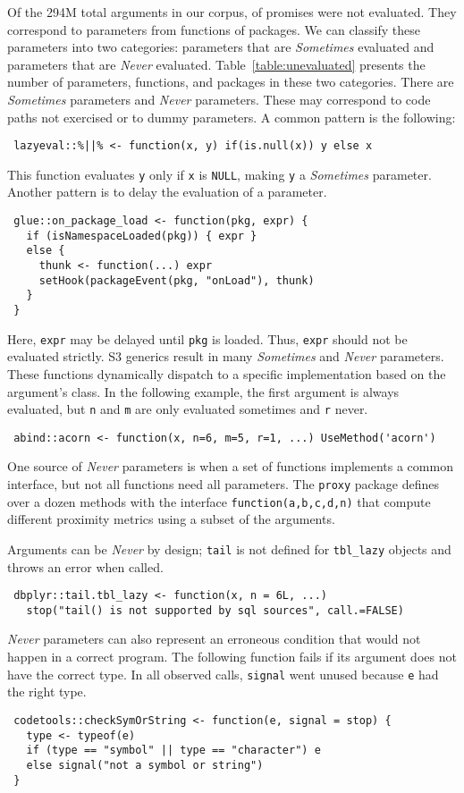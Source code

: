 \documentclass[review,creen,acmsmall]{acmart}
\newcommand{\sometimes}{\emph{Sometimes}\xspace}
\newcommand{\never}{\emph{Never}\xspace}
\newcommand{\code}[1]{\lstinline |#1|\xspace}
\begin{document}
Of the 294M total arguments in our corpus, \UnevaluatedTotalCountArguments of
promises were not evaluated. They correspond to \UnevaluatedTotalCountParameters
parameters from \UnevaluatedTotalCountFunctions functions of
\UnevaluatedTotalCountPackages packages. We can classify these parameters into
two categories: parameters that are \sometimes evaluated and parameters that are
\never evaluated. Table~\ref{table:unevaluated} presents the number of
parameters, functions, and packages in these two categories. There are
\UnevaluatedSometimesCountParameters \sometimes parameters and
\UnevaluatedNeverCountParameters \never parameters. These may correspond to code
paths not exercised or to dummy parameters.
%
A common pattern is the following:
%
\begin{lstlisting}
 lazyeval::%||% <- function(x, y) if(is.null(x)) y else x
\end{lstlisting}
%
This function evaluates \code{y} only if \code{x} is \code{NULL}, making
\code{y} a \sometimes parameter.
\noindent
Another pattern is to delay the evaluation of a parameter.

\begin{lstlisting}
 glue::on_package_load <- function(pkg, expr) {
   if (isNamespaceLoaded(pkg)) { expr }
   else {
     thunk <- function(...) expr
     setHook(packageEvent(pkg, "onLoad"), thunk)
   }
 }
\end{lstlisting}
%
Here, \code{expr} may be delayed until \code{pkg} is loaded. Thus, \code{expr}
should not be evaluated strictly.
%
S3 generics result in many \sometimes and \never parameters. These functions
dynamically dispatch to a specific implementation based on the argument's class.
In the following example, the first argument is always evaluated, but \code{n}
and \code{m} are only evaluated sometimes and \code{r} never.
%
\begin{lstlisting}
 abind::acorn <- function(x, n=6, m=5, r=1, ...) UseMethod('acorn')
\end{lstlisting}
\noindent
One source of \never parameters is when a set of functions implements a common
interface, but not all functions need all parameters. The \code{proxy} package
defines over a dozen methods with the interface \code{function(a,b,c,d,n)} that
compute different proximity metrics using a subset of the arguments.

Arguments can be \never by design; \code{tail} is not defined for
\code{tbl_lazy} objects and throws an error when called.
\begin{lstlisting}
 dbplyr::tail.tbl_lazy <- function(x, n = 6L, ...)
   stop("tail() is not supported by sql sources", call.=FALSE)
\end{lstlisting}
%
\never parameters can also represent an erroneous condition that would not
happen in a correct program. The following function fails if its argument does
not have the correct type. In all observed calls, \code{signal}
went  unused because \code{e} had the right type.
\begin{lstlisting}
 codetools::checkSymOrString <- function(e, signal = stop) {
   type <- typeof(e)
   if (type == "symbol" || type == "character") e
   else signal("not a symbol or string")
 }
\end{lstlisting}
\end{document}

